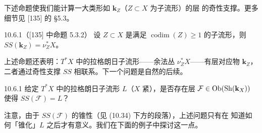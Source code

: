 下述命题使我们能计算一大类形如 $\mathbf{k}_Z$（$Z\subset X$ 为子流形）的层
的奇性支撑。更多细节见 [135] 的 §5.3。

\begin{wprop}{10.6.1}（[135] 中命题 5.3.2）
设 $Z\subset X$ 是满足 $\operatorname{codim}(Z)\ge1$ 的子流形，则
$SS(\mathbf{k}_Z)=\nu^*_ZX$。
\end{wprop}

上述命题还表明：$T^*X$ 中的拉格朗日子流形——余法丛 $\nu^*_ZX$——有层对应物
$\mathbf{k}_Z$，二者通过奇性支撑 $SS$ 相联系。下一个问题是自然的后续。

\begin{wque}{10.6.1}
给定 $T^*X$ 中的拉格朗日子流形 $L$（$X$ 紧），是否存在层
$\mathcal F\in\operatorname{Ob}(\operatorname{Sh}(\mathbf{k}_X))$ 使得 $SS(\mathcal F)=L$？
\end{wque}

注意，由于 $SS(\mathcal F)$ 的锥性（见 (10.34) 下方的段落），上述问题只有在
知道如何「锥化」$L$ 之后才有意义。我们在下面的例子中探讨这一点。

